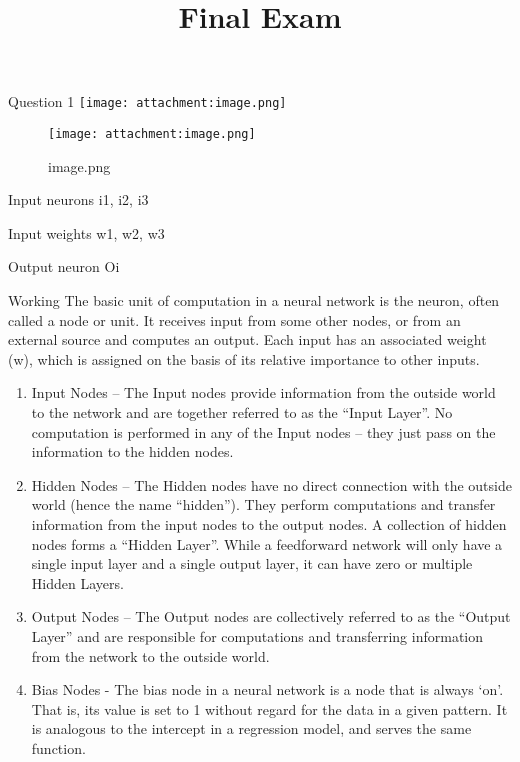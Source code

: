 \documentclass[11pt]{article}
\title{Final Exam}
\begin{document}
    
    \maketitle
    
    

    
    Question 1 \texttt{[image: attachment:image.png]}

    \begin{figure}
\centering
\texttt{[image: attachment:image.png]}
\caption{image.png}
\end{figure}

    Input neurons i1, i2, i3

Input weights w1, w2, w3

Output neuron Oi

Working The basic unit of computation in a neural network is the neuron,
often called a node or unit. It receives input from some other nodes, or
from an external source and computes an output. Each input has an
associated weight (w), which is assigned on the basis of its relative
importance to other inputs.

\begin{enumerate}
\def\labelenumi{\arabic{enumi}.}
\item
  Input Nodes -- The Input nodes provide information from the outside
  world to the network and are together referred to as the ``Input
  Layer''. No computation is performed in any of the Input nodes -- they
  just pass on the information to the hidden nodes.
\item
  Hidden Nodes -- The Hidden nodes have no direct connection with the
  outside world (hence the name ``hidden''). They perform computations
  and transfer information from the input nodes to the output nodes. A
  collection of hidden nodes forms a ``Hidden Layer''. While a
  feedforward network will only have a single input layer and a single
  output layer, it can have zero or multiple Hidden Layers.
\item
  Output Nodes -- The Output nodes are collectively referred to as the
  ``Output Layer'' and are responsible for computations and transferring
  information from the network to the outside world.
\item
  Bias Nodes - The bias node in a neural network is a node that is
  always `on'. That is, its value is set to 1 without regard for the
  data in a given pattern. It is analogous to the intercept in a
  regression model, and serves the same function.
\end{enumerate}
\end{document}
